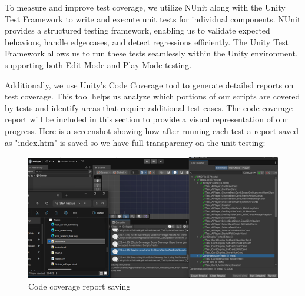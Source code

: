 \documentclass[12pt, titlepage]{article}
\begin{document}
To measure and improve test coverage, we utilize NUnit along with the Unity Test Framework to write and execute unit tests for individual components. NUnit provides a structured testing framework, enabling us to validate expected behaviors, handle edge cases, and detect regressions efficiently. The Unity Test Framework allows us to run these tests seamlessly within the Unity environment, supporting both Edit Mode and Play Mode testing.

Additionally, we use Unity's Code Coverage tool to generate detailed reports on test coverage. This tool helps us analyze which portions of our scripts are covered by tests and identify areas that require additional test cases. The code coverage report will be included in this section to provide a visual representation of our progress. Here is a screenshot showing how after running each test a report saved as "index.htm" is saved so we have full transparency on the unit testing:
\begin{figure}[h]
    \centering
    \includegraphics[width=1.1\textwidth]{saveReport.png}  %
    \caption{Code coverage report saving}
    \label{fig:coverage}
\end{figure}
\end{document}
